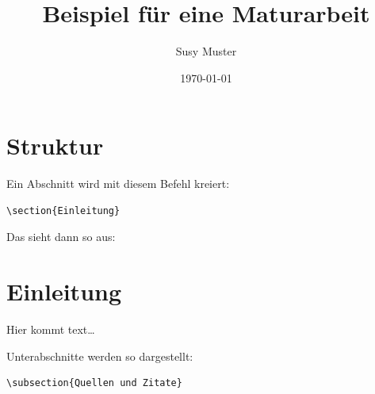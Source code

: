 \documentclass[12pt,a4paper]{article} %
\title{Beispiel für eine Maturarbeit}
\date{\today}
\author{Susy Muster}
\begin{document}
\maketitle %
% 











\newpage %
\tableofcontents %











\newpage

\section{Struktur}

Ein Abschnitt wird mit diesem Befehl kreiert:
\begin{verbatim}
\section{Einleitung}
\end{verbatim}

Das sieht dann so aus:

\section{Einleitung}
Hier kommt text\ldots 

Unterabschnitte werden so dargestellt:

\begin{verbatim}
\subsection{Quellen und Zitate}
\end{verbatim}
\end{document}
